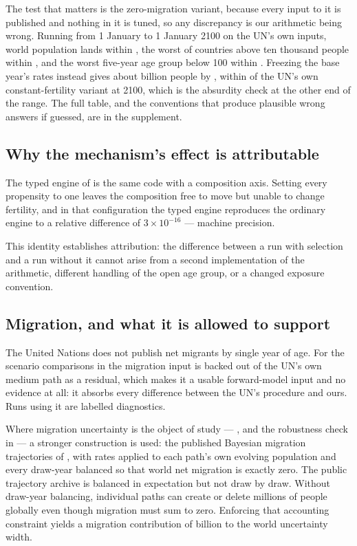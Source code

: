 The test that matters is the zero-migration variant, because every input to it is
published and nothing in it is tuned, so any discrepancy is our arithmetic being
wrong. Running from 1 January \PhaseFiveBaseYear{} to 1 January 2100 on the UN's
own inputs, world population lands within \ValidationWorld{}, the worst of
\ValidationGatedCountries{} countries above ten thousand people within
\ValidationCountry{}, and the worst five-year age group below 100 within
\ValidationAge{}. Freezing the base year's rates instead gives about
\ConstantFertilityTwentyOneFifty{} billion people by \ProjectionEndYear{}, within
\ValidationConstantFertility{} of the UN's own constant-fertility variant at
2100, which is the absurdity check at the other end of the range. The full table,
and the conventions that produce plausible wrong answers if guessed, are in the
supplement.

\subsection{Why the mechanism's effect is attributable}

The typed engine of  is the same code with a composition
axis. Setting every propensity to one leaves the composition free to move but
unable to change fertility, and in that configuration the typed engine reproduces
the ordinary engine to a relative difference of $3\times10^{-16}$ --- machine
precision.

This identity establishes attribution: the difference between a run with
selection and a run without it cannot arise from a second implementation of the
arithmetic, different handling of the open age group, or a changed exposure
convention.

\subsection{Migration, and what it is allowed to support}

The United Nations does not publish net migrants by single year of age. For the
scenario comparisons in  the migration input is backed out of
the UN's own medium path as a residual, which makes it a usable forward-model
input and no evidence at all: it absorbs every difference between the UN's
procedure and ours. Runs using it are labelled diagnostics.

Where migration uncertainty is the object of study --- , and
the robustness check in  --- a stronger construction is used:
the published Bayesian migration trajectories of \citet{azose2015}, with rates
applied to each path's own evolving population and every draw-year balanced so
that world net migration is exactly zero. The public trajectory archive is
balanced in expectation but not draw by draw. Without draw-year balancing,
individual paths can create or delete millions of people globally even though
migration must sum to zero. Enforcing that accounting constraint yields a
migration contribution of \WidthMigration{} billion to the world uncertainty
width.
